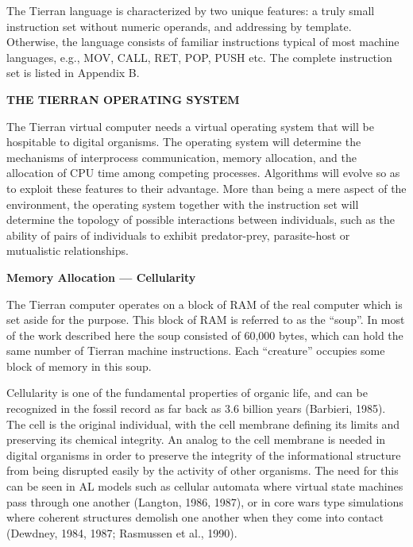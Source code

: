The Tierran language is characterized by two unique features: a truly small
instruction set without numeric operands, and addressing by template.
Otherwise, the language consists of familiar instructions typical of most
machine languages, e.g., MOV, CALL, RET, POP, PUSH etc.  The complete
instruction set is listed in Appendix B.

\LP
\bf THE TIERRAN OPERATING SYSTEM\rm
\eLP

The Tierran virtual computer needs a virtual operating system that will be
hospitable to digital organisms.  The operating system will determine the
mechanisms of interprocess communication, memory allocation, and the
allocation of CPU time among competing processes.  Algorithms will
evolve so as to exploit these features to their advantage.  More than being
a mere aspect of the environment, the operating system together with the
instruction set will determine the
topology of possible interactions between individuals, such as the ability
of pairs of individuals to exhibit predator-prey, parasite-host or 
mutualistic relationships.

\LP
\bf Memory Allocation --- Cellularity\rm
\eLP

The Tierran computer operates on a block of RAM of the real computer which
is set aside for the purpose.  This block of RAM is referred to as the
``soup''.  In most of the work described here the soup consisted of 60,000
bytes, which can hold the same number of Tierran machine instructions.  Each
``creature'' occupies some block of memory in this soup.

Cellularity is one of the fundamental properties of organic life, and can
be recognized in the fossil record as far back as 3.6 billion years (Barbieri,
1985).  The cell is the original individual, with the cell membrane defining
its limits and preserving its chemical integrity.  An analog to the cell
membrane is needed in digital organisms in order to preserve the integrity of
the informational structure from being disrupted easily by the activity of
other organisms.  The need for this can be seen in AL models such as cellular
automata where virtual state machines pass through one another (Langton, 1986,
1987), or in core wars type simulations where coherent structures
demolish one another when they come into contact (Dewdney, 1984, 1987;
Rasmussen et al., 1990).

